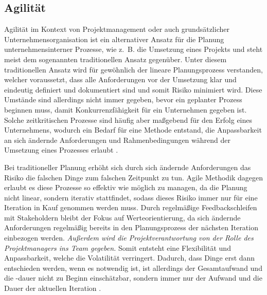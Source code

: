 \subsection{Agilität}
Agilität im Kontext von Projektmanagement oder auch grundsätzlicher Unternehmensorganisation ist ein alternativer Ansatz für die Planung unternehmensinterner Prozesse, wie z. B. die Umsetzung eines Projekts und steht meist dem sogenannten traditionellen Ansatz gegenüber. Unter diesem traditionellen Ansatz wird für gewöhnlich der lineare Planungsprozess verstanden, welcher voraussetzt, dass alle Anforderungen vor der Umsetzung klar und eindeutig definiert und dokumentiert sind und somit Risiko minimiert wird. Diese Umstände sind allerdings nicht immer gegeben, bevor ein geplanter Prozess beginnen muss, damit Konkurrenzfähigkeit für ein Unternehmen gegeben ist. Solche zeitkritischen Prozesse sind häufig aber maßgebend für den Erfolg eines Unternehmens, wodurch ein Bedarf für eine Methode entstand, die Anpassbarkeit an sich ändernde Anforderungen und Rahmenbedingungen während der Umsetzung eines Prozesses erlaubt \cite{agilismVsTranditionalApproaches}.

Bei traditioneller Planung erhöht sich durch sich ändernde Anforderungen das Risiko die falschen Dinge zum falschen Zeitpunkt zu tun. Agile Methodik  dagegen erlaubt es diese Prozesse so effektiv wie möglich zu managen, da die Planung nicht linear, sondern iterativ stattfindet, sodass dieses Risiko immer nur für eine Iteration in Kauf genommen werden muss. Durch regelmäßige Feedbackschleifen mit Stakeholdern bleibt der Fokus auf Werteorientierung, da sich ändernde Anforderungen regelmäßig bereits in den Planungsprozess der nächsten Iteration einbezogen werden. \emph{Außerdem wird die Projektverantwortung von der Rolle des Projektmanagers ins Team gegeben.}
Somit entsteht eine Flexibilität und Anpassbarkeit, welche die Volatilität verringert. Dadurch, dass Dinge erst dann entschieden werden, wenn es notwendig ist, ist allerdings der Gesamtaufwand und die -dauer nicht zu Beginn einschätzbar, sondern immer nur der Aufwand und die Dauer der aktuellen Iteration \cite{agilismVsTranditionalApproaches}.

